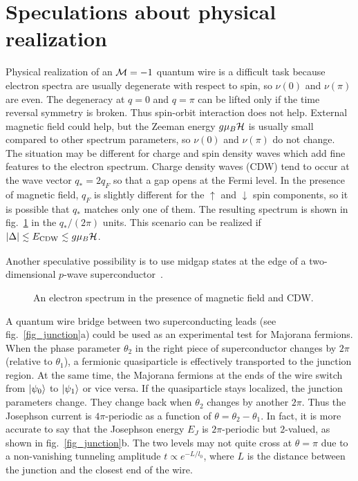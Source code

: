 \section{Speculations about physical realization}
\label{sec_realization}

Physical realization of an ${\cal M}=-1$ quantum wire is a difficult task because
electron spectra are usually degenerate with respect to spin, so $\nu(0)$ and
$\nu(\pi)$ are even. The degeneracy at $q=0$ and $q=\pi$ can be lifted only if
the time reversal symmetry is broken. Thus spin-orbit interaction does not
help. External magnetic field could help, but the Zeeman energy $g\mu_B{\cal
H}$ is usually small compared to other spectrum parameters, so $\nu(0)$ and
$\nu(\pi)$ do not change. The situation may be different for charge and spin
density waves which add fine features to the electron spectrum.  Charge
density waves (CDW) tend to occur at the wave vector $q_*=2q_F$ so that a gap
opens at the Fermi level. In the presence of magnetic field, $q_F$ is slightly
different for the $\uparrow$ and $\downarrow$ spin components, so it is
possible that $q_*$ matches only one of them. The resulting spectrum is shown
in fig.~\ref{fig_spectrum} in the $q_*/(2\pi)$ units. This scenario can be
realized if $|\Delta|\lesssim E_{\rm CDW}\lesssim g\mu_B{\cal H}$.

Another speculative possibility is to use midgap states at the edge of a
two-dimensional $p$-wave superconductor~\cite{midgap}.

\begin{figure}[ht]
\centerline{}
\caption{An electron spectrum in the presence of magnetic field and CDW.}
\label{fig_spectrum}
\end{figure}

A quantum wire bridge between two superconducting leads (see
fig.~\ref{fig_junction}a) could be used as an experimental test for Majorana
fermions. When the phase parameter $\theta_2$ in the right piece of
superconductor changes by $2\pi$ (relative to $\theta_1$), a fermionic
quasiparticle is effectively transported to the junction region. At the same
time, the Majorana fermions at the ends of the wire switch from $|\psi_0\rangle$
to $|\psi_1\rangle$ or vice versa. If the quasiparticle stays localized, the
junction parameters change. They change back when $\theta_2$ changes by
another $2\pi$. Thus the Josephson current is $4\pi$-periodic as a function of
$\theta=\theta_2-\theta_1$. In fact, it is more accurate to say that the
Josephson energy $E_J$ is $2\pi$-periodic but $2$-valued, as shown in
fig.~\ref{fig_junction}b. The two levels may not quite cross at $\theta=\pi$
due to a non-vanishing tunneling amplitude $t\propto e^{-L/l_0}$, where $L$ is
the distance between the junction and the closest end of the wire.


